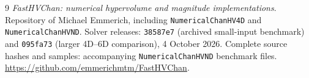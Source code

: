 \documentclass[12pt,a4paper]{article}
\theoremstyle{definition}
\begin{document}
\begin{thebibliography}{9}
\emph{FastHVChan: numerical hypervolume and magnitude implementations}.
\newblock Repository of Michael Emmerich, including
\texttt{NumericalChanHV4D} and \texttt{NumericalChanHVND}.
\newblock Solver releases: \texttt{38587e7} (archived small-input
benchmark) and \texttt{095fa73} (larger 4D--6D comparison), 4 October 2026.
\newblock Complete source hashes and samples: accompanying
\texttt{NumericalChanHVND} benchmark files.
\newblock \url{https://github.com/emmerichmtm/FastHVChan}.
\end{thebibliography}
\end{document}
